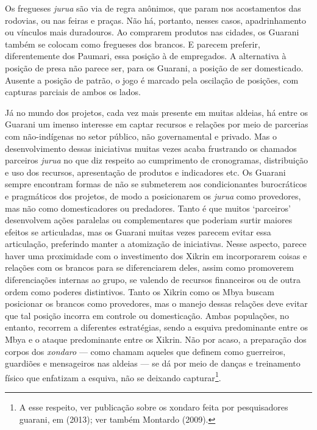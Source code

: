 {Os fregueses \emph{jurua} são via de regra anônimos, que param nos acostamentos
das rodovias, ou nas feiras e praças. Não há, portanto, nesses casos,
apadrinhamento ou vínculos mais duradouros. Ao comprarem produtos nas
cidades, os Guarani também se colocam como fregueses dos brancos. E
parecem preferir, diferentemente dos Paumari, essa posição à de
empregados. A alternativa à posição de presa não parece ser, para os
Guarani, a posição de ser domesticado. Ausente a posição de patrão, o
jogo é marcado pela oscilação de posições, com capturas parciais de
ambos os lados.

Já no mundo dos projetos, cada vez mais presente em muitas aldeias, há
entre os Guarani um imenso interesse em captar recursos e relações por
meio de parcerias com não-indígenas no setor público, não governamental
e privado. Mas o desenvolvimento dessas iniciativas muitas vezes acaba
frustrando os chamados parceiros \emph{jurua} no que diz respeito ao
cumprimento de cronogramas, distribuição e uso dos recursos,
apresentação de produtos e indicadores etc. Os Guarani sempre encontram
formas de não se submeterem aos condicionantes burocráticos e
pragmáticos dos projetos, de modo a posicionarem os \emph{jurua} como
provedores, mas não como domesticadores ou predadores. Tanto é que
muitos `parceiros' desenvolvem ações paralelas ou complementares que
poderiam surtir maiores efeitos se articuladas, mas os Guarani muitas
vezes parecem evitar essa articulação, preferindo manter a atomização
de iniciativas. Nesse aspecto, parece haver uma proximidade com o
investimento dos Xikrin em incorporarem coisas e relações com os
brancos para se diferenciarem deles, assim como promoverem
diferenciações internas ao grupo, se valendo de recursos financeiros ou
de outra ordem como poderes distintivos. Tanto os Xikrin como os Mbya
buscam posicionar os brancos como provedores, mas o manejo dessas
relações deve evitar que tal posição incorra em controle ou
domesticação. Ambas populações, no entanto, recorrem a diferentes
estratégias, sendo a esquiva predominante entre os Mbya e o ataque
predominante entre os Xikrin. Não por acaso, a preparação dos corpos
dos \emph{xondaro} --- como chamam aqueles que definem como guerreiros,
guardiões e mensageiros nas aldeias --- se dá por meio de danças e
treinamento físico que enfatizam a esquiva, não se deixando
capturar\footnote{A esse respeito, ver publicação sobre os xondaro
feita por pesquisadores guarani, em  (2013); ver também Montardo
(2009).}.

}
